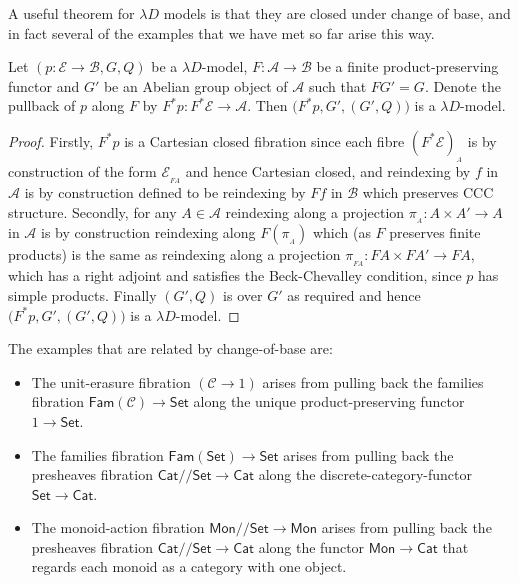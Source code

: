 \documentclass[a4paper,UKenglish]{lipics}
\newcommand{\ra}{\rightarrow}
\newcommand{\msf}[1]{\mathsf{#1}} %
\newcommand{\Mon}{\msf{Mon}}
\newcommand{\Set}{\msf{Set}}
\newcommand{\Cat}{\msf{Cat}}
\newcommand{\Fam}[1]{\msf{Fam}(#1)}
\newcommand{\A}{\mathcal{A}}
\newcommand{\B}{\mathcal{B}}
\newcommand{\C}{\mathcal{C}}
\newcommand{\E}{\mathcal{E}}
\newcommand{\fibre}[2]{#1_{_{#2}}}
\newcommand{\fibreE}[1]{\E_{_{#1}}}
\newcommand{\GroupSet}[1]{#1/\!/\Set}
\newcommand{\MonSet}{\GroupSet{\Mon}}
\newcommand{\CatSet}{\GroupSet{\Cat}}
\newcommand{\bbracket}[1]{\bigl( #1 \bigr)}
\begin{document}
A useful theorem for $\lambda D$ models is that they are closed under change of base, and in fact several of the examples that we have met so far arise this way.
\begin{theorem}
Let $(p: \E \ra \B, G, Q)$ be a $\lambda D$-model, $F:\A \ra \B$ be a finite product-preserving functor and $G'$ be an Abelian group object of $\A$ such that $FG' = G$.  Denote the pullback of $p$ along $F$ by $F^\ast p : F^\ast \E \rightarrow \A$. Then $\bbracket{F^{\ast}p, G', (G',Q)}$ is a $\lambda D$-model.
\end{theorem}

\begin{proof}
Firstly, $F^*p$ is a Cartesian closed fibration since each fibre $\fibre{(F^*\E)}{A}$ is by construction of the form $\fibreE{FA}$ and hence Cartesian closed, and  reindexing by $f$ in $\A$ is by construction defined to be reindexing by $Ff$ in $\B$ which preserves CCC structure. Secondly, for any $A \in \A$ reindexing along a projection $\pi_{_{A}}: A \times A' \rightarrow A$ in $\A$ is by construction reindexing along $F(\pi_{_{A}})$ which (as $F$ preserves finite products) is the same as reindexing along a projection $\pi_{_{FA}} : FA \times FA' \rightarrow FA$, which has a right adjoint and satisfies the Beck-Chevalley condition, since $p$ has simple products. Finally $(G', Q)$ is over $G'$ as required and hence $\bbracket{F^{\ast}p, G', (G',Q)}$ is a $\lambda D$-model.
\end{proof}

\noindent The examples that are related by change-of-base are:
\begin{itemize}
\item The unit-erasure fibration $(\C\to 1)$ arises from pulling back the families fibration
$\Fam\C\to\Set$ along the unique product-preserving functor $1\to\Set$.
\item The families fibration $\Fam\Set\to\Set$ arises from pulling back the presheaves fibration
$\CatSet\to\Cat$ along the discrete-category-functor $\Set\to\Cat$.
\item The monoid-action fibration $\MonSet\to\Mon$ arises from pulling
  back the presheaves fibration $\CatSet\to\Cat$ along the functor
  $\Mon\to\Cat$ that regards each monoid as a category with one
  object.
\end{itemize}
\end{document}
